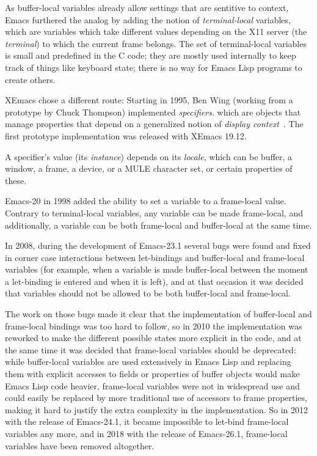 \documentclass[format=acmsmall, review]{acmart}
\newcommand \Elisp {Emacs Lisp}
\begin{document}
As buffer-local variables already allow settings that are sentitive to
context, Emacs furthered the analog by adding the notion of
\emph{terminal-local} variables, which are variables which take
different values depending on the X11 server (the \emph{terminal}) to
which the current frame belongs.  The set of terminal-local variables
is small and predefined in the C code; they are mostly used internally
to keep track of things like keyboard state; there is no way for
\Elisp{} programs to create others.

XEmacs chose a different route: Starting in 1995, Ben Wing (working
from a prototype by Chuck Thompson) implemented
\emph{specifiers}. which are objects that manage properties that
depend on a generalized notion of \emph{display
  context}~\cite{XEmacsLispRef1998}.  The first prototype
implementation was released with XEmacs 19.12.

A specifier's value (its \emph{instance}) depends on its
\emph{locale}, which can be buffer, a window, a frame, a device, or a MULE
character set, or certain properties of these.

Emacs-20 in 1998 added the ability to set a variable to a frame-local
value.  Contrary to terminal-local variables, any variable can be made
frame-local, and additionally, a variable can be both frame-local and
buffer-local at the same time.

In 2008, during the development of Emacs-23.1 several bugs were found and
fixed in corner case interactions between let-bindings and buffer-local and
frame-local variables (for example, when a variable is made buffer-local
between the moment a let-binding is entered and when it is left), and at
that occasion it was decided that variables should not be allowed to be both
buffer-local and frame-local.

The work on those bugs made it clear that the implementation of buffer-local
and frame-local bindings was too hard to follow, so in 2010 the
implementation was reworked to make the different possible states more
explicit in the code, and at the same time it was decided that frame-local
variables should be deprecated: while buffer-local variables are used
extensively in \Elisp{} and replacing them with explicit accesses to fields
or properties of buffer objects would make \Elisp{} code heavier,
frame-local variables were not in widespread use and could easily be
replaced by more traditional use of accessors to frame properties, making it
hard to justify the extra complexity in the implementation.  So in 2012 with
the release of Emacs-24.1, it became impossible to let-bind frame-local
variables any more, and in 2018 with the release of Emacs-26.1, frame-local
variables have been removed altogether.
\end{document}
